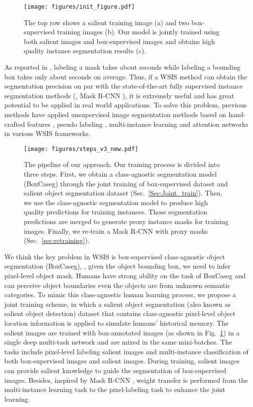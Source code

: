 \documentclass[final]{cvpr}
\begin{document}
\begin{figure}[thp]
\centering
\texttt{[image: figures/init\_figure.pdf]}
\caption{The top row shows a salient training image (a) and two box-supervised training images (b). Our model is jointly trained using both salient images and box-supervised images and obtains high quality instance segmentation results (c).}
\label{fig:first}
\end{figure}


As reported in \cite{bearman2016s}, labeling a mask takes about  seconds while labeling a bounding box takes only about  seconds on average. Thus, if a WSIS method can obtain the segmentation precision on par with the state-of-the-art fully supervised instance segmentation methods (\eg, Mask R-CNN \cite{he2017mask}), it is extremely useful and has great potential to be applied in real world applications. To solve this problem, previous methods have applied unsupervised image segmentation methods based on hand-crafted features \cite{rother2004grabcut,pont2016multiscale}, pseudo labeling \cite{dai2015boxsup,song2019box,arun2020weakly}, multi-instance learning \cite{hsu2019weakly} and attention networks \cite{kulharia12356box2seg} in various WSIS frameworks.

\begin{figure*}[htp]
\centering
\texttt{[image: figures/steps\_v3\_new.pdf]}
\caption{The pipeline of our approach. Our training process is divided into three steps. First, we obtain a class-agnostic segmentation model (BoxCaseg) through the joint training of box-supervised dataset and salient object segmentation dataset (Sec.~\ref{Sec:Joint_train}). Then, we use the class-agnostic segmentation model to produce high quality predictions for training instances. Those segmentation predictions are merged to generate proxy instance masks for training images. Finally, we re-train a Mask R-CNN with proxy masks (Sec.~\ref{sec:retraining}).}
\label{fig:framework}
\end{figure*}

We think the key problem in WSIS is box-supervised class-agnostic object segmentation (BoxCaseg), \ie, given the object bounding box, we need to infer pixel-level object mask. Humans have strong ability on the task of BoxCaseg and can perceive object boundaries even the objects are from unknown semantic categories. To mimic this class-agnostic human learning process, we propose a joint training scheme, in which a salient object segmentation (also known as salient object detection) dataset that contains class-agnostic pixel-level object location information is applied to simulate humans' historical memory. The salient images are trained with box-annotated images (as shown in Fig.~\ref{fig:first}) in a single deep multi-task network and are mixed in the same mini-batches. The tasks include pixel-level labeling salient images and multi-instance classification \cite{hsu2019weakly} of both box-supervised images and salient images. During training, salient images can provide salient knowledge to guide the segmentation of box-supervised images. Besides, inspired by Mask R-CNN \cite{hu2018learning}, weight transfer is performed from the multi-instance learning task to the pixel-labeling task to enhance the joint learning.
\end{document}
